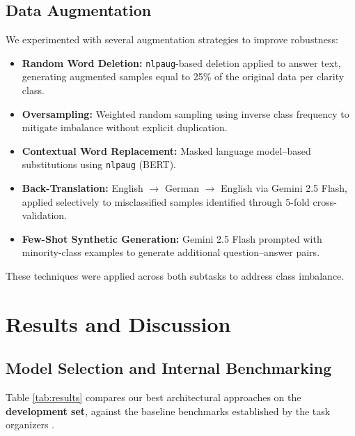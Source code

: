\documentclass[11pt]{article}
\begin{document}
\subsection{Data Augmentation}
We experimented with several augmentation strategies to improve robustness:

\begin{itemize}
    \item \textbf{Random Word Deletion:} \texttt{nlpaug}-based deletion applied to answer text, generating augmented samples equal to 25\% of the original data per clarity class.
    \item \textbf{Oversampling:} Weighted random sampling using inverse class frequency to mitigate imbalance without explicit duplication.
    \item \textbf{Contextual Word Replacement:} Masked language model–based substitutions using \texttt{nlpaug} (BERT).
    \item \textbf{Back-Translation:} English $\rightarrow$ German $\rightarrow$ English via Gemini 2.5 Flash, applied selectively to misclassified samples identified through 5-fold cross-validation.
    \item \textbf{Few-Shot Synthetic Generation:} Gemini 2.5 Flash prompted with minority-class examples to generate additional question–answer pairs.
\end{itemize}

These techniques were applied across both subtasks to address class imbalance.


\section{Results and Discussion}

\subsection{Model Selection and Internal Benchmarking}
Table \ref{tab:results} compares our best architectural approaches on the \textbf{development set}, against the baseline benchmarks established by the task organizers \citep{b4}.
\end{document}

